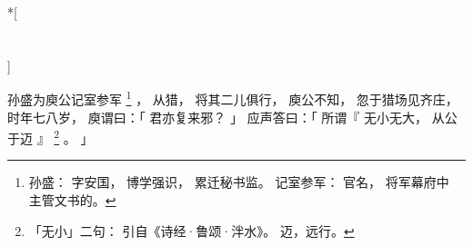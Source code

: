 
\switchcolumn[0]*[\section{}]

孙盛为庾公记室参军%
\footnote{%
    孙盛：
        字安国，
        博学强识，
        累迁秘书监。
    记室参军：
        官名，
        将军幕府中
        主管文书的。
}%
，
从猎，
将其二儿俱行，
庾公不知，
忽于猎场见齐庄，
时年七八岁，
庾谓曰：「
    君亦复来邪？
」
应声答曰：「
    所谓『
        无小无大，
        从公于迈
    』%
    \footnote{%
        「无小」二句：
            引自《诗经·鲁颂·泮水》。
            迈，远行。
    }%
    。
」

\switchcolumn


